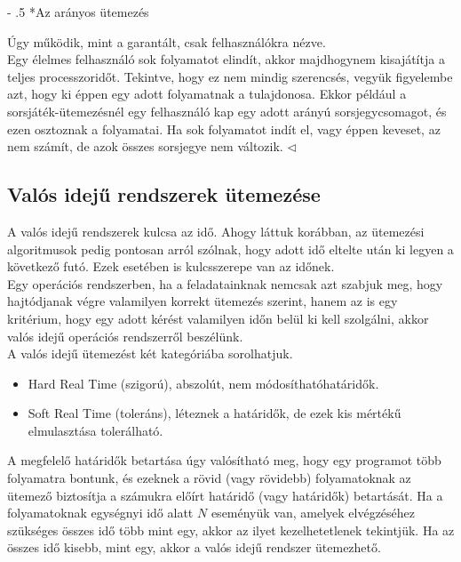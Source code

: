 \documentclass[tikz,12pt,margin=0px]{article}
\makeatletter
\renewcommand\paragraph{%
	\@startsection{paragraph}{4}{0mm}%
	{-\baselineskip}%
	{.5\baselineskip}%
	{\normalfont\normalsize\bfseries}}
\makeatother
\begin{document}
    \paragraph*{Az arányos ütemezés}

    \noindent Úgy működik, mint a garantált, csak felhasználókra nézve.\\

    {\footnotesize \noindent {\color{blue} \faLightbulbO\ $\triangleright$ } }
    {\footnotesize
    Egy élelmes felhasználó sok folyamatot elindít, akkor majdhogynem kisajátítja a teljes processzoridőt. Tekintve, hogy ez nem mindig szerencsés, vegyük figyelembe azt, hogy ki éppen egy adott folyamatnak a tulajdonosa. Ekkor például a sorsjáték-ütemezésnél egy felhasználó kap egy adott arányú sorsjegycsomagot, és ezen osztoznak a folyamatai. Ha sok folyamatot indít el, vagy éppen keveset, az nem számít, de azok összes sorsjegye nem változik.
    $\triangleleft$ \faLightbulbO}\\

    \subsection*{Valós idejű rendszerek ütemezése}

    A valós idejű rendszerek kulcsa az idő. Ahogy láttuk korábban, az ütemezési algoritmusok pedig pontosan arról szólnak, hogy adott idő eltelte után ki legyen a következő futó. Ezek esetében is kulcsszerepe van az időnek.\\

    \noindent Egy operációs rendszerben, ha a feladatainknak nemcsak azt szabjuk meg, hogy hajtódjanak végre valamilyen korrekt ütemezés szerint, hanem az is egy kritérium, hogy egy adott kérést valamilyen időn belül ki kell szolgálni, akkor valós idejű operációs rendszerről beszélünk.\\

    \noindent A valós idejű ütemezést két kategóriába sorolhatjuk.
	\begin{itemize}[topsep=8pt,itemsep=4pt,partopsep=4pt, parsep=4pt]
		\item Hard Real Time (szigorú), abszolút, nem módosíthatóhatáridők.
		\item Soft Real Time (toleráns), léteznek a határidők, de ezek kis mértékű elmulasztása tolerálható.\\
	\end{itemize}

    \noindent A megfelelő határidők betartása úgy valósítható meg, hogy egy programot több folyamatra bontunk, és ezeknek a rövid (vagy rövidebb) folyamatoknak az ütemező biztosítja a számukra előírt határidő (vagy határidők) betartását. Ha a folyamatoknak egységnyi idő alatt $N$ eseményük van, amelyek elvégzéséhez szükséges összes idő több mint egy, akkor az ilyet kezelhetetlenek tekintjük. Ha az összes idő kisebb, mint egy, akkor a valós idejű rendszer ütemezhető.
\end{document}
